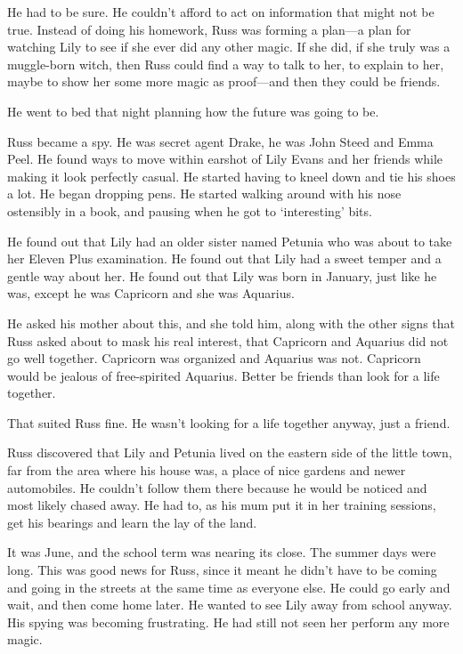 He had to be sure. He couldn't afford to act on information that might not be true. Instead of doing his homework, Russ was forming a plan—a plan for watching Lily to see if she ever did any other magic. If she did, if she truly was a muggle-born witch, then Russ could find a way to talk to her, to explain to her, maybe to show her some more magic as proof—and then they could be friends.

He went to bed that night planning how the future was going to be.

Russ became a spy. He was secret agent Drake, he was John Steed and Emma Peel. He found ways to move within earshot of Lily Evans and her friends while making it look perfectly casual. He started having to kneel down and tie his shoes a lot. He began dropping pens. He started walking around with his nose ostensibly in a book, and pausing when he got to `interesting' bits.

He found out that Lily had an older sister named Petunia who was about to take her Eleven Plus examination. He found out that Lily had a sweet temper and a gentle way about her. He found out that Lily was born in January, just like he was, except he was Capricorn and she was Aquarius.

He asked his mother about this, and she told him, along with the other signs that Russ asked about to mask his real interest, that Capricorn and Aquarius did not go well together. Capricorn was organized and Aquarius was not. Capricorn would be jealous of free-spirited Aquarius. Better be friends than look for a life together.

That suited Russ fine. He wasn't looking for a life together anyway, just a friend.

Russ discovered that Lily and Petunia lived on the eastern side of the little town, far from the area where his house was, a place of nice gardens and newer automobiles. He couldn't follow them there because he would be noticed and most likely chased away. He had to, as his mum put it in her training sessions, get his bearings and learn the lay of the land.

It was June, and the school term was nearing its close. The summer days were long. This was good news for Russ, since it meant he didn't have to be coming and going in the streets at the same time as everyone else. He could go early and wait, and then come home later. He wanted to see Lily away from school anyway. His spying was becoming frustrating. He had still not seen her perform any more magic.

